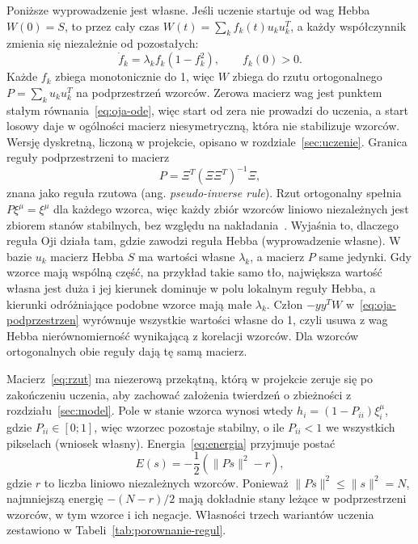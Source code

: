 Poniższe wyprowadzenie jest własne. Jeśli uczenie startuje od wag Hebba $W(0) = S$, to przez cały czas $W(t) = \sum_k f_k(t) u_k u_k^T$, a każdy współczynnik zmienia się niezależnie od pozostałych:
\begin{equation}
    \dot f_k = \lambda_k f_k \left(1 - f_k^2\right), \qquad f_k(0) > 0.
    \label{eq:oja-widmo}
\end{equation}
Każde $f_k$ zbiega monotonicznie do 1, więc $W$ zbiega do rzutu ortogonalnego $P = \sum_k u_k u_k^T$ na podprzestrzeń wzorców. Zerowa macierz wag jest punktem stałym równania~\eqref{eq:oja-ode}, więc start od zera nie prowadzi do uczenia, a start losowy daje w ogólności macierz niesymetryczną, która nie stabilizuje wzorców. Wersję dyskretną, liczoną w projekcie, opisano w rozdziale~\ref{sec:uczenie}.
Granica reguły podprzestrzeni to macierz
\begin{equation}
    P = \Xi^T \left(\Xi \Xi^T\right)^{-1} \Xi,
    \label{eq:rzut}
\end{equation}
znana jako reguła rzutowa (ang. \textit{pseudo-inverse rule}). Rzut ortogonalny spełnia $P \xi^\mu = \xi^\mu$ dla każdego wzorca, więc każdy zbiór wzorców liniowo niezależnych jest zbiorem stanów stabilnych, bez względu na nakładania~\cite[s.~L-361--L-364]{personnaz1985}. Wyjaśnia to, dlaczego reguła Oji działa tam, gdzie zawodzi reguła Hebba (wyprowadzenie własne). W bazie $u_k$ macierz Hebba $S$ ma wartości własne $\lambda_k$, a macierz $P$ same jedynki. Gdy wzorce mają wspólną część, na przykład takie samo tło, największa wartość własna jest duża i jej kierunek dominuje w polu lokalnym reguły Hebba, a kierunki odróżniające podobne wzorce mają małe $\lambda_k$. Człon $-y y^T W$ w~\eqref{eq:oja-podprzestrzen} wyrównuje wszystkie wartości własne do 1, czyli usuwa z wag Hebba nierównomierność wynikającą z korelacji wzorców. Dla wzorców ortogonalnych obie reguły dają tę samą macierz.

Macierz~\eqref{eq:rzut} ma niezerową przekątną, którą w projekcie zeruje się po zakończeniu uczenia, aby zachować założenia twierdzeń o zbieżności z rozdziału~\ref{sec:model}. Pole w stanie wzorca wynosi wtedy $h_i = (1 - P_{ii}) \xi^\mu_i$, gdzie $P_{ii} \in [0; 1]$, więc wzorzec pozostaje stabilny, o ile $P_{ii} < 1$ we wszystkich pikselach (wniosek własny). Energia~\eqref{eq:energia} przyjmuje postać
\begin{equation}
    E(s) = -\frac{1}{2} \left(\lVert P s \rVert^2 - r\right),
    \label{eq:energia-rzut}
\end{equation}
gdzie $r$ to liczba liniowo niezależnych wzorców. Ponieważ $\lVert P s \rVert^2 \le \lVert s \rVert^2 = N$, najmniejszą energię $-(N - r)/2$ mają dokładnie stany leżące w podprzestrzeni wzorców, w tym wzorce i ich negacje. Własności trzech wariantów uczenia zestawiono w Tabeli~\ref{tab:porownanie-regul}.

